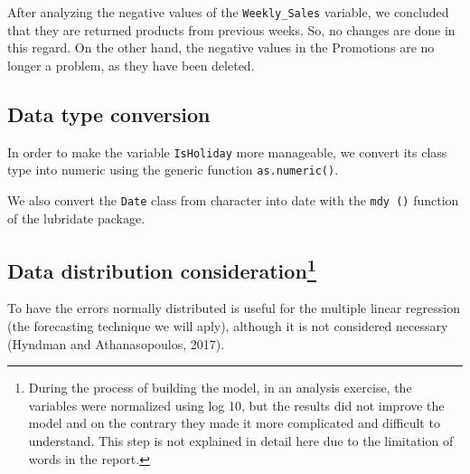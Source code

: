\documentclass[11pt,]{article}
\newenvironment{Shaded}{\begin{snugshade}}{\end{snugshade}}
\newcommand{\KeywordTok}[1]{\textcolor[rgb]{0.13,0.29,0.53}{\textbf{{#1}}}}
\newcommand{\StringTok}[1]{\textcolor[rgb]{0.31,0.60,0.02}{{#1}}}
\newcommand{\CommentTok}[1]{\textcolor[rgb]{0.56,0.35,0.01}{\textit{{#1}}}}
\newcommand{\NormalTok}[1]{{#1}}
\let\rmarkdownfootnote\footnote%
\def\footnote{\protect\rmarkdownfootnote}
\begin{document}
After analyzing the negative values of the \texttt{Weekly\_Sales}
variable, we concluded that they are returned products from previous
weeks. So, no changes are done in this regard. On the other hand, the
negative values in the Promotions are no longer a problem, as they have
been deleted.

\subsection{Data type conversion}\label{data-type-conversion}

In order to make the variable \texttt{IsHoliday} more manageable, we
convert its class type into numeric using the generic function
\texttt{as.numeric()}.

\begin{Shaded}
\end{Shaded}

We also convert the \texttt{Date} class from character into date with
the \texttt{mdy\ ()} function of the lubridate package.

\begin{Shaded}
\end{Shaded}

\subsection[Data distribution consideration]{\texorpdfstring{Data
distribution consideration\footnote{During the process of building the
  model, in an analysis exercise, the variables were normalized using
  log 10, but the results did not improve the model and on the contrary
  they made it more complicated and difficult to understand. This step
  is not explained in detail here due to the limitation of words in the
  report.}}{Data distribution consideration}}\label{data-distribution-consideration}

To have the errors normally distributed is useful for the multiple
linear regression (the forecasting technique we will aply), although it
is not considered necessary (Hyndman and Athana­sopou­los, 2017).
\end{document}
